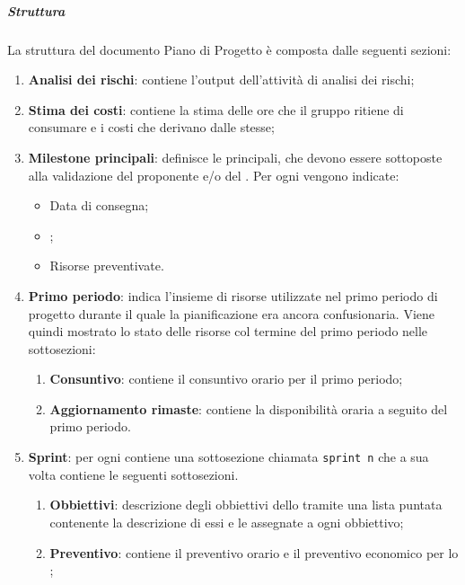 \subparagraph{Struttura}
\label{subsec:struttura_piano}
La struttura del documento Piano di Progetto è composta dalle seguenti sezioni:
\begin{enumerate}
    \item \textbf{Analisi dei rischi}: contiene l'output dell'attività di analisi dei rischi;

    \item \textbf{Stima dei costi}: contiene la stima delle ore che il gruppo ritiene di consumare e i costi che derivano dalle stesse;
    
    \item \textbf{Milestone principali}: definisce le  principali, che devono essere sottoposte alla validazione del proponente e/o del .
    Per ogni  vengono indicate:
    \begin{itemize}
        \item Data di consegna;
        \item {};
        \item Risorse preventivate.
    \end{itemize}
    
    \item \textbf{Primo periodo}: indica l'insieme di risorse utilizzate nel primo periodo di progetto durante il quale la pianificazione era ancora confusionaria.
    Viene quindi mostrato lo stato delle risorse col termine del primo periodo nelle sottosezioni:
    \begin{enumerate}
        \item \textbf{Consuntivo}: contiene il consuntivo orario per il primo periodo;

        \item \textbf{Aggiornamento rimaste}: contiene la disponibilità oraria a seguito del primo periodo.
    \end{enumerate}
    
    \item \textbf{Sprint}: per ogni  contiene una sottosezione chiamata \texttt{sprint n} che a sua volta contiene le seguenti sottosezioni.
    \begin{enumerate}
        \item \textbf{Obbiettivi}: descrizione degli obbiettivi dello  tramite una lista puntata contenente la descrizione di essi e le  assegnate a ogni obbiettivo;

        \item \textbf{Preventivo}: contiene il preventivo orario e il preventivo economico per lo ;



\end{enumerate}
\end{enumerate}
